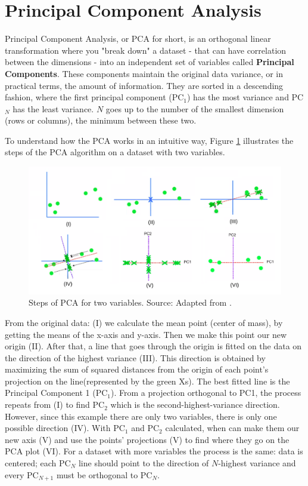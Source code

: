 \section{Principal Component Analysis}

Principal Component Analysis, or PCA for short, is an orthogonal linear transformation \cite{wikipedia_pca} where you "break down" a dataset - that can have correlation between the dimensions - into an independent set of variables called \textbf{Principal Components}. These components maintain the original data variance, or in practical terms, the amount of information. They are sorted in a descending fashion, where the first principal component (PC$_{1}$) has the most variance and PC$_{N}$ has the least variance. $N$ goes up to the number of the smallest dimension (rows or columns), the minimum between these two. 

To understand how the PCA works in an intuitive way, Figure \ref{fig:pca-steps} illustrates the steps of the PCA algorithm on a dataset with two variables.

\begin{figure}[h]
   \centering
   \includegraphics[width=\linewidth]{fig/ch2-pca-steps.png}
   \caption{Steps of PCA for two variables. Source: Adapted from \cite{pcastepsyoutube}.}
   \label{fig:pca-steps}
\end{figure}

From the original data: (I) we calculate the mean point (center of mass), by getting the means of the x-axis and y-axis. Then we make this point our new origin (II). After that, a line that goes through the origin is fitted on the data on the direction of the highest variance (III). This direction is obtained by maximizing the sum of squared distances from the origin of each point's projection on the line(represented by the green Xs). The best fitted line is the Principal Component 1 (PC$_{1}$). From a projection orthogonal to PC1, the process repeats from (I) to find PC$_{2}$ which is the second-highest-variance direction. However, since this example there are only two variables, there is only one possible direction (IV). With PC$_{1}$ and PC$_{2}$ calculated, when can make them our new axis (V) and use the points' projections (V) to find where they go on the PCA plot (VI). For a dataset with more variables the process is the same: data is centered; each PC$_{N}$ line should point to the direction of $N$-highest variance and every PC$_{N+1}$ must be orthogonal to PC$_{N}$.

